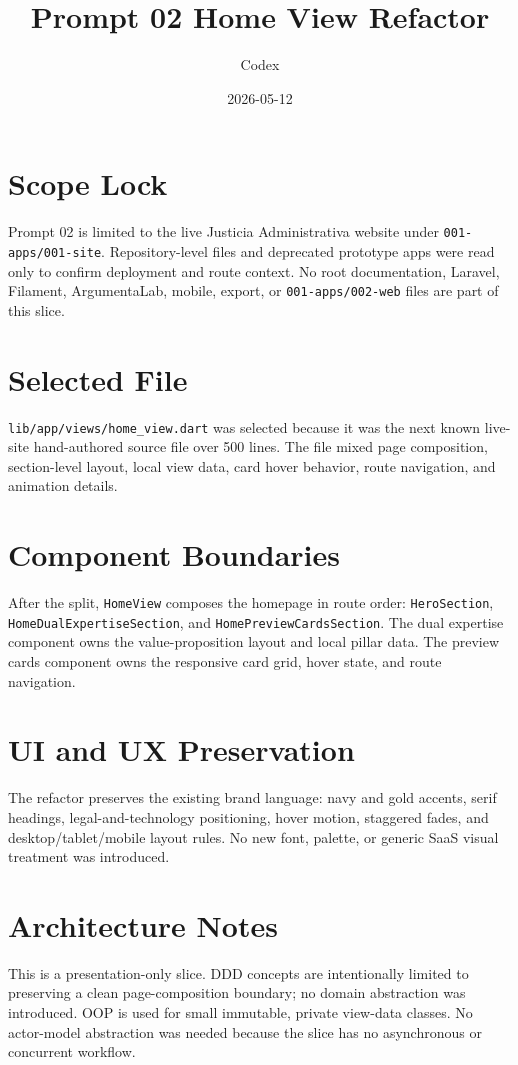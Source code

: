 \documentclass[11pt]{article}
\title{Prompt 02 Home View Refactor}
\author{Codex}
\date{2026-05-12}
\begin{document}
\maketitle

\section{Scope Lock}
Prompt 02 is limited to the live Justicia Administrativa website under \texttt{001-apps/001-site}. Repository-level files and deprecated prototype apps were read only to confirm deployment and route context. No root documentation, Laravel, Filament, ArgumentaLab, mobile, export, or \texttt{001-apps/002-web} files are part of this slice.

\section{Selected File}
\texttt{lib/app/views/home\_view.dart} was selected because it was the next known live-site hand-authored source file over 500 lines. The file mixed page composition, section-level layout, local view data, card hover behavior, route navigation, and animation details.

\section{Component Boundaries}
After the split, \texttt{HomeView} composes the homepage in route order: \texttt{HeroSection}, \texttt{HomeDualExpertiseSection}, and \texttt{HomePreviewCardsSection}. The dual expertise component owns the value-proposition layout and local pillar data. The preview cards component owns the responsive card grid, hover state, and route navigation.

\section{UI and UX Preservation}
The refactor preserves the existing brand language: navy and gold accents, serif headings, legal-and-technology positioning, hover motion, staggered fades, and desktop/tablet/mobile layout rules. No new font, palette, or generic SaaS visual treatment was introduced.

\section{Architecture Notes}
This is a presentation-only slice. DDD concepts are intentionally limited to preserving a clean page-composition boundary; no domain abstraction was introduced. OOP is used for small immutable, private view-data classes. No actor-model abstraction was needed because the slice has no asynchronous or concurrent workflow.
\end{document}

